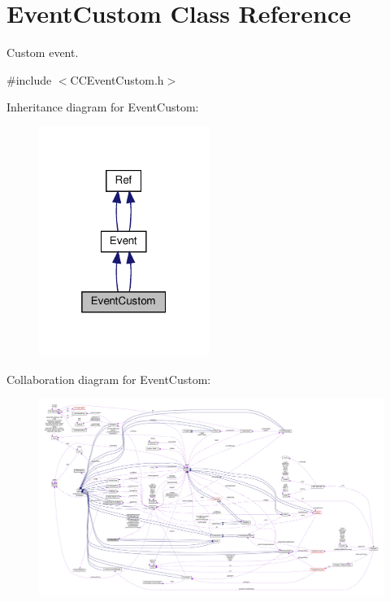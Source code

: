 \hypertarget{classEventCustom}{}\section{Event\+Custom Class Reference}
\label{classEventCustom}


Custom event.  




{\ttfamily \#include $<$C\+C\+Event\+Custom.\+h$>$}



Inheritance diagram for Event\+Custom\+:
\nopagebreak
\begin{figure}[H]
\begin{center}
\leavevmode
\includegraphics[width=157pt]{classEventCustom__inherit__graph}
\end{center}
\end{figure}


Collaboration diagram for Event\+Custom\+:
\nopagebreak
\begin{figure}[H]
\begin{center}
\leavevmode
\includegraphics[width=350pt]{classEventCustom__coll__graph}
\end{center}
\end{figure}

